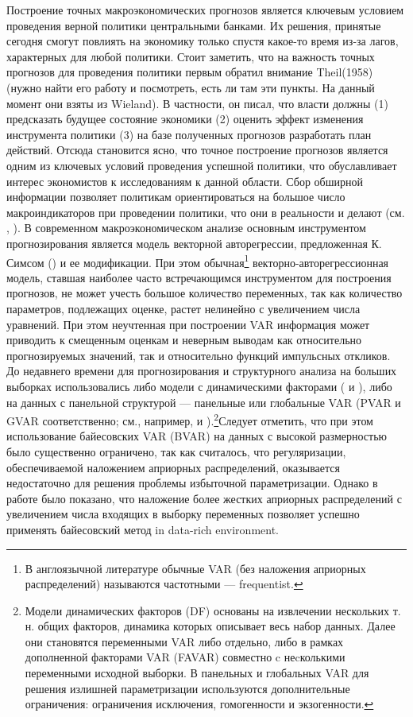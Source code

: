 \documentclass[11pt]{article} %
\begin{document}
Построение точных  макроэкономических прогнозов является ключевым условием проведения верной политики центральными  банками. Их решения, принятые сегодня смогут повлиять на экономику только спустя какое-то время из-за лагов, характерных для любой политики. Стоит заметить, что на важность точных прогнозов для проведения политики первым обратил внимание Theil(1958) (нужно найти его работу и посмотреть, есть ли там эти пункты. На данный момент они взяты из Wieland). В частности, он писал, что власти  должны (1) предсказать будущее состояние экономики (2) оценить эффект изменения инструмента политики (3) на базе полученных прогнозов разработать план действий.  Отсюда становится ясно, что точное построение прогнозов является одним из ключевых условий проведения успешной политики, что обуславливает интерес экономистов к исследованиям к данной области. 
Сбор обширной информации позволяет политикам ориентироваться на большое число макроиндикаторов при проведении политики, что они в реальности и делают (см. \cite{beckner_1996}, \cite{bernanke_boivin_2003}).
В современном макроэкономическом анализе основным инструментом прогнозирования является модель векторной авторегрессии, предложенная К. Симсом (\cite{sims_1980}) и ее модификации.  При этом обычная\footnote{В англоязычной литературе обычные VAR (без наложения априорных распределений) называются частотными --- frequentist.} векторно-авторегрессионная модель, ставшая наиболее часто встречающимся инструментом для построения прогнозов, не может учесть большое количество переменных, так как количество параметров, подлежащих оценке, растет нелинейно с увеличением числа уравнений.  При этом неучтенная при построении VAR информация может приводить к смещенным оценкам и  неверным выводам  как относительно прогнозируемых значений, так и относительно функций импульсных откликов. До недавнего времени для прогнозирования и структурного анализа на больших выборках использовались либо модели с динамическими факторами (\cite{forni_al_2000} и \cite{stock_watson_2002}), либо на данных с панельной структурой --- панельные или глобальные VAR (PVAR и GVAR соответственно; см., например,  \cite{pesaran_al_2004} и \cite{dees_guntner_2014}).\footnote{Модели динамических факторов (DF) основаны на извлечении нескольких т. н. общих факторов, динамика которых описывает весь набор данных.  Далее они становятся переменными VAR либо отдельно, либо в рамках дополненной факторами VAR (FAVAR) совместно c неcколькими переменными исходной выборки. В панельных и глобальных VAR для решения излишней параметризации используются дополнительные ограничения: ограничения исключения, гомогенности и экзогенности.}Следует отметить, что при этом использование байесовских VAR (BVAR) на данных с высокой размерностью было существенно ограничено, так как считалось, что регуляризации, обеспечиваемой наложением априорных распределений, оказывается недостаточно для решения проблемы избыточной параметризации. Однако в работе \cite{demol_al_2008} было показано, что наложение более жестких априорных распределений с увеличением числа входящих в выборку переменных позволяет успешно применять байесовский метод in data-rich environment. 
\end{document}
